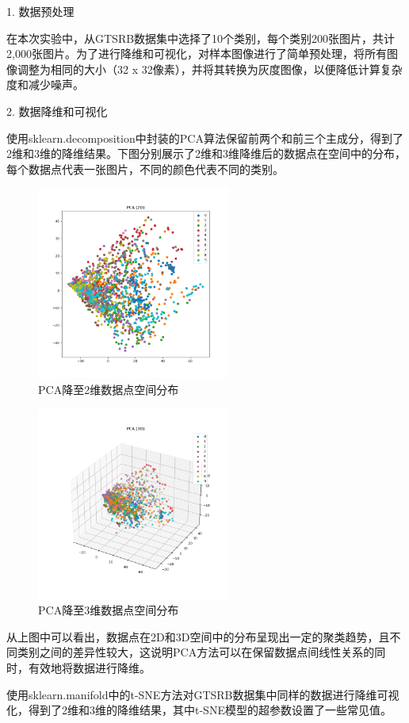 \documentclass[lettersize,journal]{IEEEtran}
\begin{document}
1. 数据预处理

在本次实验中，从GTSRB数据集中选择了10个类别，每个类别200张图片，共计2,000张图片。为了进行降维和可视化，对样本图像进行了简单预处理，将所有图像调整为相同的大小（32 x 32像素），并将其转换为灰度图像，以便降低计算复杂度和减少噪声。

2. 数据降维和可视化

使用sklearn.decomposition中封装的PCA算法保留前两个和前三个主成分，得到了2维和3维的降维结果。下图分别展示了2维和3维降维后的数据点在空间中的分布，每个数据点代表一张图片，不同的颜色代表不同的类别。

\begin{figure}[H]
\centering
\includegraphics[width=2.5in]{image/Figure_1.png}
\caption{PCA降至2维数据点空间分布}
\end{figure}

\begin{figure}[H]
\centering
\includegraphics[width=2.5in]{image/Figure_3.png}
\caption{PCA降至3维数据点空间分布}
\end{figure}

从上图中可以看出，数据点在2D和3D空间中的分布呈现出一定的聚类趋势，且不同类别之间的差异性较大，这说明PCA方法可以在保留数据点间线性关系的同时，有效地将数据进行降维。

使用sklearn.manifold中的t-SNE方法对GTSRB数据集中同样的数据进行降维可视化，得到了2维和3维的降维结果，其中t-SNE模型的超参数设置了一些常见值。
\end{document}
